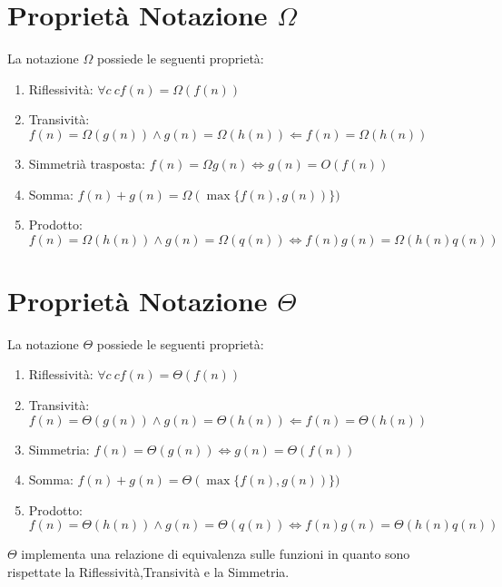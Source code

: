 
\section{Proprietà Notazione $\Omega$}
La notazione $\Omega$ possiede le seguenti proprietà:
\begin{enumerate}
  \item Riflessività: $\forall c\ cf(n) = \Omega(f(n))$
  \item Transività: $f(n) = \Omega(g(n)) \land g(n)= \Omega(h(n)) \Leftarrow f(n) = \Omega(h(n))$
  \item Simmetrià trasposta: $f(n) = \Omega g(n) \Leftrightarrow g(n) = O(f(n))$
  \item Somma: $f(n) + g(n) = \Omega(\max\{f(n),g(n))\})$
  \item Prodotto: $f(n) = \Omega(h(n)) \land g(n) = \Omega(q(n)) \Leftrightarrow f(n)g(n) = \Omega(h(n)q(n))$
\end{enumerate}


\section{Proprietà Notazione $\Theta$}
La notazione $\Theta$ possiede le seguenti proprietà:
\begin{enumerate}
  \item Riflessività: $\forall c\ cf(n) = \Theta(f(n))$
  \item Transività: $f(n) = \Theta(g(n)) \land g(n) = \Theta(h(n)) \Leftarrow f(n)= \Theta(h(n))$
  \item Simmetria: $f(n) = \Theta(g(n)) \Leftrightarrow g(n) = \Theta(f(n))$
  \item Somma: $f(n) + g(n) = \Theta(\max\{f(n),g(n))\})$
  \item Prodotto: $f(n) = \Theta(h(n)) \land g(n) = \Theta(q(n)) \Leftrightarrow f(n)g(n) = \Theta(h(n)q(n))$
\end{enumerate}

$\Theta$ implementa una relazione di equivalenza sulle funzioni in quanto
sono rispettate la Riflessività,Transività e la Simmetria.

